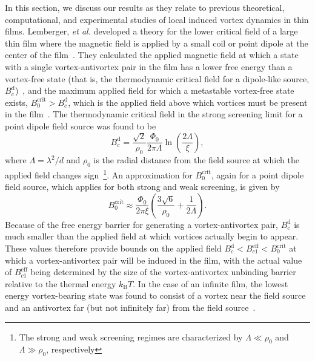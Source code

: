 \documentclass[%
 reprint,
 superscriptaddress,
 amsmath,
 amssymb,
 amsfonts,
 aps,
 prb,
]{revtex4-2}
\begin{document}
In this section, we discuss our results as they relate to previous theoretical, computational, and experimental studies of local induced vortex dynamics in thin films. Lemberger, \textit{et al.} developed a theory for the lower critical field of a large thin film where the magnetic field is applied by a small coil or point dipole at the center of the film~\cite{Lemberger2013-lu, Lemberger2013-ha}. They calculated the applied magnetic field at which a state with a single vortex-antivortex pair in the film has a lower free energy than a vortex-free state (that is, the thermodynamic critical field for a dipole-like source, $B_{c}^\mathrm{d}$)~\cite{Lemberger2013-lu}, and the maximum applied field for which a metastable vortex-free state exists, $B_0^\mathrm{crit} > B_{c}^\mathrm{d}$, which is the applied field above which vortices must be present in the film~\cite{Lemberger2013-ha}. The thermodynamic critical field in the strong screening limit for a point dipole field source was found to be
\begin{equation}
    B_{c}^\mathrm{d}=\frac{\sqrt{2}}{\rho_0}\frac{\Phi_0}{2\pi\Lambda}\ln\left(\frac{2\Lambda}{\xi}\right),
    \label{eq:B0c1}
\end{equation}
where $\Lambda=\lambda^2/d$ and $\rho_0$ is the radial distance from the field source at which the applied field changes sign~\footnote{The strong and weak screening regimes are characterized by $\Lambda \ll \rho_0$ and $\Lambda \gg \rho_0$, respectively}. An approximation for $B_0^\mathrm{crit}$, again for a point dipole field source, which applies for both strong and weak screening, is given by
\begin{equation}
    B_0^\mathrm{crit}\approx\frac{\Phi_0}{2\pi\xi}\left(\frac{3\sqrt{6}}{\rho_0}+\frac{1}{2\Lambda}\right).
    \label{eq:B0crit}
\end{equation}
Because of the free energy barrier for generating a vortex-antivortex pair, $B_{c}^\mathrm{d}$ is much smaller than the applied field at which vortices actually begin to appear. These values therefore provide bounds on the applied field $B_{c}^\mathrm{d} < B_{c1}^\mathrm{eff} < B_0^\mathrm{crit}$ at which a vortex-antivortex pair will be induced in the film, with the actual value of $B_{c1}^\mathrm{eff}$ being determined by the size of the vortex-antivortex unbinding barrier relative to the thermal energy $k_\mathrm{B}T$. In the case of an infinite film, the lowest energy vortex-bearing state was found to consist of a vortex near the field source and an antivortex far (but not infinitely far) from the field source~\cite{Lemberger2013-lu}.
\end{document}
